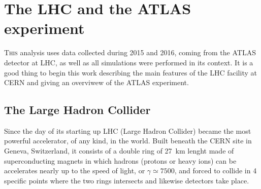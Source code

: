 
\chapter{The LHC and the ATLAS experiment}
\lettrine{T}{his} analysis uses data collected during 2015 and 2016, coming from the ATLAS detector at LHC, as well as all simulations were performed in its context. It is a good thing to begin this work describing the main features of the LHC facility at CERN and giving an overviwew of the ATLAS experiment. 

\section{The Large Hadron Collider}
Since the day of its starting up LHC (Large Hadron Collider) became the most powerful accelerator, of any kind, in the world. Built beneath the CERN site in Geneva, Switzerland, it consists of a double ring of \SI{27}{\km} lenght made of superconducting magnets in which hadrons (protons or heavy ions) can be accelerates nearly up to the speed of light, or $\gamma\simeq7500$, and forced to collide in 4 specific points where the two rings intersects and likewise detectors take place.

